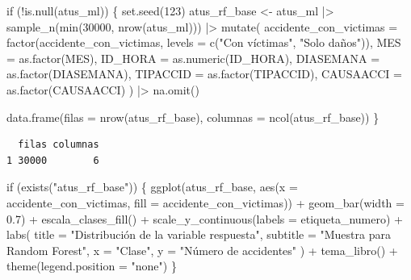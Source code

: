 \documentclass[
  spanish,
  11pt,
  letterpaper,
]{book}
\newenvironment{Shaded}{}{}
\newcommand{\AttributeTok}[1]{\textcolor[rgb]{0.84,0.23,0.29}{#1}}
\newcommand{\ControlFlowTok}[1]{\textcolor[rgb]{0.84,0.23,0.29}{#1}}
\newcommand{\DecValTok}[1]{\textcolor[rgb]{0.00,0.36,0.77}{#1}}
\newcommand{\FloatTok}[1]{\textcolor[rgb]{0.00,0.36,0.77}{#1}}
\newcommand{\FunctionTok}[1]{\textcolor[rgb]{0.44,0.26,0.76}{#1}}
\newcommand{\NormalTok}[1]{\textcolor[rgb]{0.14,0.16,0.18}{#1}}
\newcommand{\OtherTok}[1]{\textcolor[rgb]{0.44,0.26,0.76}{#1}}
\newcommand{\SpecialCharTok}[1]{\textcolor[rgb]{0.00,0.36,0.77}{#1}}
\newcommand{\StringTok}[1]{\textcolor[rgb]{0.01,0.18,0.38}{#1}}
\newcounter{none} %
\begin{document}
\begin{Shaded}
\begin{Highlighting}[]
\ControlFlowTok{if}\NormalTok{ (}\SpecialCharTok{!}\FunctionTok{is.null}\NormalTok{(atus\_ml)) \{}
  \FunctionTok{set.seed}\NormalTok{(}\DecValTok{123}\NormalTok{)}
\NormalTok{  atus\_rf\_base }\OtherTok{\textless{}{-}}\NormalTok{ atus\_ml }\SpecialCharTok{|\textgreater{}}
    \FunctionTok{sample\_n}\NormalTok{(}\FunctionTok{min}\NormalTok{(}\DecValTok{30000}\NormalTok{, }\FunctionTok{nrow}\NormalTok{(atus\_ml))) }\SpecialCharTok{|\textgreater{}}
    \FunctionTok{mutate}\NormalTok{(}
      \AttributeTok{accidente\_con\_victimas =} \FunctionTok{factor}\NormalTok{(accidente\_con\_victimas, }\AttributeTok{levels =} \FunctionTok{c}\NormalTok{(}\StringTok{"Con víctimas"}\NormalTok{, }\StringTok{"Solo daños"}\NormalTok{)),}
      \AttributeTok{MES =} \FunctionTok{as.factor}\NormalTok{(MES),}
      \AttributeTok{ID\_HORA =} \FunctionTok{as.numeric}\NormalTok{(ID\_HORA),}
      \AttributeTok{DIASEMANA =} \FunctionTok{as.factor}\NormalTok{(DIASEMANA),}
      \AttributeTok{TIPACCID =} \FunctionTok{as.factor}\NormalTok{(TIPACCID),}
      \AttributeTok{CAUSAACCI =} \FunctionTok{as.factor}\NormalTok{(CAUSAACCI)}
\NormalTok{    ) }\SpecialCharTok{|\textgreater{}}
    \FunctionTok{na.omit}\NormalTok{()}

  \FunctionTok{data.frame}\NormalTok{(}\AttributeTok{filas =} \FunctionTok{nrow}\NormalTok{(atus\_rf\_base), }\AttributeTok{columnas =} \FunctionTok{ncol}\NormalTok{(atus\_rf\_base))}
\NormalTok{\}}
\end{Highlighting}
\end{Shaded}

\begin{verbatim}
  filas columnas
1 30000        6
\end{verbatim}

\begin{Shaded}
\begin{Highlighting}[]
\ControlFlowTok{if}\NormalTok{ (}\FunctionTok{exists}\NormalTok{(}\StringTok{"atus\_rf\_base"}\NormalTok{)) \{}
  \FunctionTok{ggplot}\NormalTok{(atus\_rf\_base, }\FunctionTok{aes}\NormalTok{(}\AttributeTok{x =}\NormalTok{ accidente\_con\_victimas, }\AttributeTok{fill =}\NormalTok{ accidente\_con\_victimas)) }\SpecialCharTok{+}
    \FunctionTok{geom\_bar}\NormalTok{(}\AttributeTok{width =} \FloatTok{0.7}\NormalTok{) }\SpecialCharTok{+}
    \FunctionTok{escala\_clases\_fill}\NormalTok{() }\SpecialCharTok{+}
    \FunctionTok{scale\_y\_continuous}\NormalTok{(}\AttributeTok{labels =}\NormalTok{ etiqueta\_numero) }\SpecialCharTok{+}
    \FunctionTok{labs}\NormalTok{(}
      \AttributeTok{title =} \StringTok{"Distribución de la variable respuesta"}\NormalTok{,}
      \AttributeTok{subtitle =} \StringTok{"Muestra para Random Forest"}\NormalTok{,}
      \AttributeTok{x =} \StringTok{"Clase"}\NormalTok{,}
      \AttributeTok{y =} \StringTok{"Número de accidentes"}
\NormalTok{    ) }\SpecialCharTok{+}
    \FunctionTok{tema\_libro}\NormalTok{() }\SpecialCharTok{+}
    \FunctionTok{theme}\NormalTok{(}\AttributeTok{legend.position =} \StringTok{"none"}\NormalTok{)}
\NormalTok{\}}
\end{Highlighting}
\end{Shaded}
\end{document}

